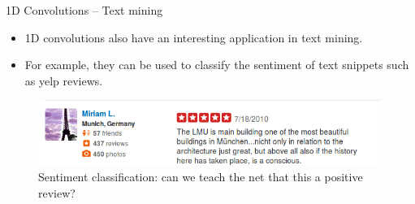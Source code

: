 \begin{vbframe}{1D Convolutions -- Text mining}
    \begin{itemize}
        \item 1D convolutions also have an interesting application in text mining.
        \item For example, they can be used to classify the sentiment of text snippets such as yelp reviews.
    \end{itemize}
    \begin{figure}
        \centering
        \includegraphics[width=12cm]{plots/05_conv_variations/1d/yelp_lmu.png}
        \caption{Sentiment classification: can we teach the net that this a positive review?}
    \end{figure}
\end{vbframe}

